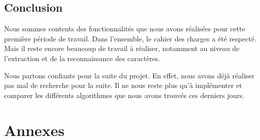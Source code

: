 \documentclass[11pt]{report}
\begin{document}
\chapter{Conclusion}


Nous sommes contents des fonctionnalités que nous avons réalisées pour cette première période de travail. Dans l'ensemble, le cahier des charges a été respecté. Mais il reste encore beaucoup de travail à réaliser, notamment au niveau de l'extraction et de la reconnaissance des caractères.

Nous partons confiants pour la suite du projet. En effet, nous avons déjà réaliser pas mal de recherche pour la suite. Il ne nous reste plus qu'à implémenter et comparer les différents algorithmes que nous avons trouvés ces derniers jours.

\newpage
{}
\part*{Annexes}

\newpage
\listoffigures
 
\end{document}
